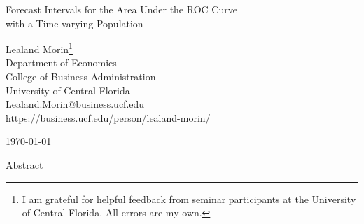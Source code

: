 



\begin{center}
\vspace{3.0in}


{\Large
Forecast Intervals for the Area Under the ROC Curve \\
with a Time-varying Population \\
}

\vspace{0.75in}


{\large{Lealand Morin\footnote{I am grateful for helpful feedback
from seminar participants at
the University of Central Florida. %
All errors are my own. } \\
Department of Economics \\
%
College of Business Administration \\
University of Central Florida \\
Lealand.Morin@business.ucf.edu \\
https://business.ucf.edu/person/lealand-morin/ }}




\vspace{0.5in}

\today

\vspace{0.50in}



{\large{Abstract}}  \\
\vspace{0.25in}

\end{center}

